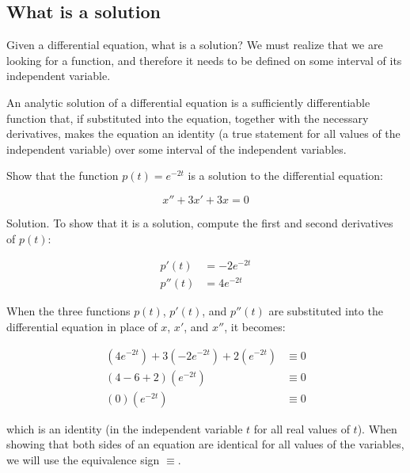   \subsection{What is a solution}

    Given a differential equation, what is a solution? We must realize that we are looking for a function, and therefore it needs to be defined on some interval of its independent variable.

    \begin{definition}
      An analytic solution of a differential equation is a sufficiently differentiable function that, if substituted into the equation, together with the necessary derivatives, makes the equation an identity (a true statement for all values of the independent variable) over some interval of the independent variables.
    \end{definition}

    \begin{problem}
      Show that the function $p(t)=e^{-2t}$ is a solution to the differential equation:

      \begin{equation}
        x'' + 3x' + 3x = 0
      \end{equation}
  
      Solution. To show that it is a solution, compute the first and second derivatives of $p(t)$:
  
      \begin{align}
        p'(t) &=- 2e^{ - 2t}\\
        p''(t) &= 4e^{ - 2t}
      \end{align}
  
      When the three functions $p(t)$, $p'(t)$, and $p''(t)$ are substituted into the differential equation in place of $x$, $x'$, and $x''$, it becomes:
  
      \begin{align}
        (4e^{ - 2t}) + 3( - 2e^{ - 2t}) + 2(e^{ - 2t})&\equiv 0\\
        (4 - 6 + 2)(e^{ - 2t})&\equiv0\\
        (0)(e^{ - 2t})&\equiv0
      \end{align}
  
      which is an identity (in the independent variable $t$ for all real values of $t$).
      When showing that both sides of an equation are identical for all values of the variables, we will use the equivalence sign $\equiv$.
    \end{problem}

